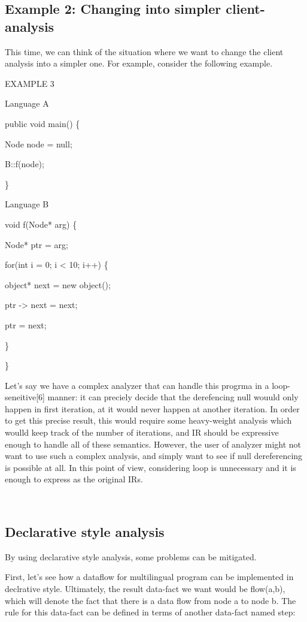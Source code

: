 \subsection{Example 2: Changing into simpler client-analysis}

This time, we can think of the situation where we want to change the client analysis
into a simpler one. For example, consider the following example.

EXAMPLE 3

Language A

public void main() \{

  Node node = null;

  B::f(node);

\}

Language B

void f(Node* arg) \{

  Node* ptr = arg;

  for(int i = 0; i < 10; i++) \{

    object* next = new object();
    
    ptr -> next = next;

    ptr = next;
  
  \}

\}

Let's say we have a complex analyzer that can handle this progrma in a
loop-seneitive[6] manner: it can preciely decide that the derefencing null
wouuld only happen in first iteration, at it would never happen at another
iteration.  In order to get this precise result, this would require some
heavy-weight analysis which woulld keep track of the number of iterations, and
IR should be expressive enough to handle all of these semantics.  However, the
user of analyzer might not want to use such a complex analysis, and simply want
to see if null dereferencing is possible at all. In this point of view,
considering loop is unnecessary and it is enough to express as the original IRs.


~~~

\subsection{Declarative style analysis}

By using declarative style analysis, some problems can be mitigated.

First, let's see how a dataflow for multilingual program can be implemented in
declrative style. Ultimately, the result data-fact we want would be flow(a,b),
which will denote the fact that there is a data flow from node a to node b. The
rule for this data-fact can be defined in terms of another data-fact named
step:

